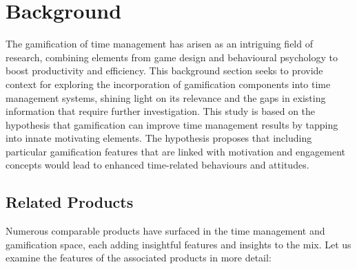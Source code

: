 \documentclass{l4proj}
\begin{document}


    


\chapter{Background}
The gamification of time management has arisen as an intriguing field of research, combining elements from game design and behavioural psychology to boost productivity and efficiency. This background section seeks to provide context for exploring the incorporation of gamification components into time management systems, shining light on its relevance and the gaps in existing information that require further investigation. This study is based on the hypothesis that gamification can improve time management results by tapping into innate motivating elements. The hypothesis proposes that including particular gamification features that are linked with motivation and engagement concepts would lead to enhanced time-related behaviours and attitudes.
\\
\section{Related Products}
Numerous comparable products have surfaced in the time management and gamification space, each adding insightful features and insights to the mix. Let us examine the features of the associated products in more detail:
\end{document}
